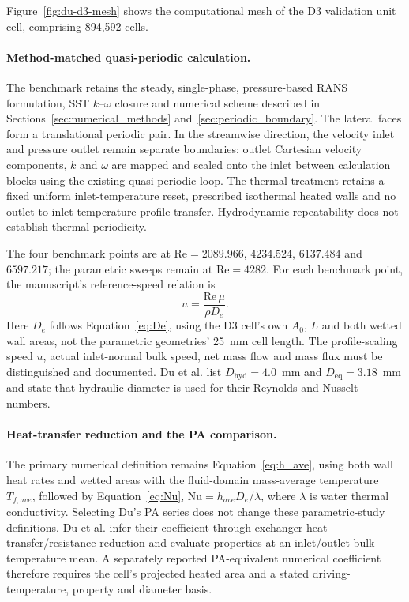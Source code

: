 

Figure~\ref{fig:du-d3-mesh} shows the computational mesh of the D3 validation unit cell, comprising 894{,}592 cells.



\paragraph{Method-matched quasi-periodic calculation.}
The benchmark retains the steady, single-phase, pressure-based RANS formulation, SST $k$--$\omega$ closure and numerical scheme described in Sections~\ref{sec:numerical_methods} and~\ref{sec:periodic_boundary}. The lateral faces form a translational periodic pair. In the streamwise direction, the velocity inlet and pressure outlet remain separate boundaries: outlet Cartesian velocity components, $k$ and $\omega$ are mapped and scaled onto the inlet between calculation blocks using the existing quasi-periodic loop. The thermal treatment retains a fixed uniform inlet-temperature reset, prescribed isothermal heated walls and no outlet-to-inlet temperature-profile transfer. Hydrodynamic repeatability does not establish thermal periodicity.

The four benchmark points are at $\mathrm{Re}=2089.966$, $4234.524$, $6137.484$ and $6597.217$; the parametric sweeps remain at $\mathrm{Re}=4282$. For each benchmark point, the manuscript's reference-speed relation is
\[
 u=\frac{\mathrm{Re}\,\mu}{\rho D_e}.
\]
Here $D_e$ follows Equation~\eqref{eq:De}, using the D3 cell's own $A_0$, $L$ and both wetted wall areas, not the parametric geometries' 25~mm cell length. The profile-scaling speed $u$, actual inlet-normal bulk speed, net mass flow and mass flux must be distinguished and documented. Du et al. list $D_{\mathrm{hyd}}=4.0$~mm and $D_{\mathrm{eq}}=3.18$~mm and state that hydraulic diameter is used for their Reynolds and Nusselt numbers. 

\paragraph{Heat-transfer reduction and the PA comparison.}
The primary numerical definition remains Equation~\eqref{eq:h_ave}, using both wall heat rates and wetted areas with the fluid-domain mass-average temperature $T_{f,ave}$, followed by Equation~\eqref{eq:Nu}, $\mathrm{Nu}=h_{ave}D_e/\lambda$, where $\lambda$ is water thermal conductivity. Selecting Du's PA series does not change these parametric-study definitions. Du et al. infer their coefficient through exchanger heat-transfer/resistance reduction and evaluate properties at an inlet/outlet bulk-temperature mean. A separately reported PA-equivalent numerical coefficient therefore requires the cell's projected heated area and a stated driving-temperature, property and diameter basis.

